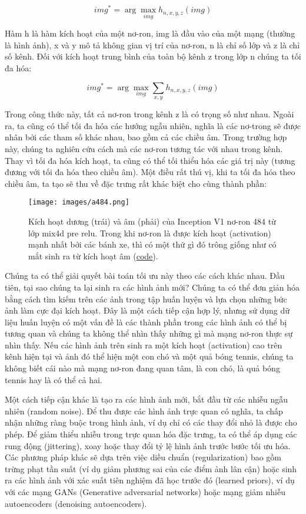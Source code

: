 \[img^*=\arg\max_{img}h_{n,x,y,z}(img)\]

Hàm h là hàm kích hoạt của một nơ-ron, img là đầu vào của một mạng (thường là hình ảnh), x và y mô tả không gian vị trí của nơ-ron, n là chỉ số lớp và z là chỉ số kênh. Đối với kích hoạt trung bình của toàn bộ kênh z trong lớp n chúng ta tối đa hóa:

\[img^*=\arg\max_{img}\sum_{x,y}h_{n,x,y,z}(img)\]

Trong công thức này, tất cả nơ-ron trong kênh z là có trọng số như nhau. Ngoài ra, ta cũng có thể tối đa hóa các hướng ngẫu nhiên, nghĩa là  các nơ-trong sẽ được nhân bởi các tham số khác nhau, bao gồm cả các chiều âm. Trong trường hợp này, chúng ta nghiên cứu cách mà các nơ-ron tương tác với nhau trong kênh. Thay vì tối đa hóa kích hoạt, ta cũng có thể tối thiểu hóa các giá trị này (tương đương với tối đa hóa theo chiều âm). Một điều rất thú vị, khi ta tối đa hóa theo chiều âm, ta tạo sẽ thu về đặc trưng rất khác biệt cho cùng thành phần:

\begin{figure*}[h!]
	\centering
	\texttt{[image: images/a484.png]}
	\label{fig:7_3}
	\caption{Kích hoạt dương (trái) và âm (phải) của Inception V1 nơ-ron 484 từ lớp mix4d pre relu. Trong khi nơ-ron là được kích hoạt (activation) mạnh nhất bởi các bánh xe, thì có một thứ gì đó trông giống như có mắt sinh ra từ kích hoạt âm (\href{https://colab.research.google.com/github/tensorflow/lucid/blob/master/notebooks/feature-visualization/negative_neurons.ipynb}{code}).}
\end{figure*}

Chúng ta có thể giải quyết bài toán tối ưu này theo các cách khác nhau. Đầu tiên, tại sao chúng ta lại sinh ra các hình ảnh mới? Chúng ta có thể đơn giản hóa bằng cách tìm kiếm trên các ảnh trong tập huấn luyện và lựa chọn những bức ảnh làm cực đại kích hoạt. Đây là một cách tiếp cận hợp lý, nhưng sử dụng dữ liệu huấn luyện có một vấn đề là các thành phần trong các hình ảnh có thể bị tương quan và chúng ta không thể nhìn thấy những gì mà mạng nơ-ron thực sự nhìn thấy. Nếu các hình ảnh trên sinh ra một kích hoạt (activation) cao trên kênh hiện tại và ảnh đó thể hiện một con chó và một quả bóng tennis, chúng ta không biết cái nào mà mạng nơ-ron đang quan tâm, là con chó, là quả bóng tennis hay là có thể cả hai.

Một cách tiếp cận khác là tạo ra các hình ảnh mới, bắt đầu từ các nhiễu ngẫu nhiên (random noise). Để thu được các hình ảnh trực quan có nghĩa, ta chấp nhận những ràng buộc trong hình ảnh, ví dụ chỉ có các thay đổi nhỏ là được cho phép. Để giảm thiểu nhiễu trong trực quan hóa đặc trưng, ta có thể áp dụng các rung động (jittering), xoay hoặc thay đổi tỷ lệ hình ảnh trước bước tối ưu hóa. Các phương pháp khác sẽ dựa trên việc diều chuẩn (regularization) bao gồm trừng phạt tần suất (ví dụ giảm phương sai của các điểm ảnh lân cận) hoặc sinh ra các hình ảnh với xác suất tiên nghiệm đã học trước đó (learned priors), ví dụ với các mạng GANs (Generative adversarial networks) hoặc mạng giảm nhiễu autoencoders (denoising autoencoders).

